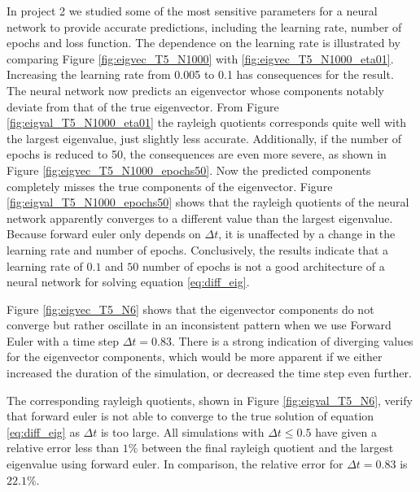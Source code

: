 \documentclass[12pt]{extarticle}
\begin{document}
In project 2 we studied some of the most sensitive parameters for a neural network to provide accurate predictions, including the learning rate, number of epochs and loss function. The dependence on the learning rate is illustrated by comparing Figure \ref{fig:eigvec_T5_N1000} with \ref{fig:eigvec_T5_N1000_eta01}. Increasing the learning rate from 0.005 to 0.1 has consequences for the result. The neural network now predicts an eigenvector whose components notably deviate from that of the true eigenvector. From Figure \ref{fig:eigval_T5_N1000_eta01} the rayleigh quotients corresponds quite well with the largest eigenvalue, just slightly less accurate. Additionally, if the number of epochs is reduced to 50, the consequences are even more severe, as shown in Figure \ref{fig:eigvec_T5_N1000_epochs50}. Now the predicted components completely misses the true components of the eigenvector. Figure \ref{fig:eigval_T5_N1000_epochs50} shows that the rayleigh quotients of the neural network apparently converges to a different value than the largest eigenvalue. Because forward euler only depends on $\Delta t$, it is unaffected by a change in the learning rate and number of epochs. Conclusively, the results indicate that a learning rate of $0.1$ and $50$ number of epochs is not a good architecture of a neural network for solving equation \eqref{eq:diff_eig}.


Figure \ref{fig:eigvec_T5_N6} shows that the eigenvector components do not converge but rather oscillate in an inconsistent pattern when we use Forward Euler with a time step $\Delta t =0.83$. There is a strong indication of diverging values for the eigenvector components, which would be more apparent if we either increased the duration of the simulation, or decreased the time step even further. 

The corresponding rayleigh quotients, shown in Figure \ref{fig:eigval_T5_N6}, verify that forward euler is not able to converge to the true solution of equation \eqref{eq:diff_eig} as $\Delta t$ is too large. All simulations with $\Delta t \leq 0.5$ have given a relative error less than $1\%$ between the final rayleigh quotient and the largest eigenvalue using forward euler. In comparison, the relative error for $\Delta t = 0.83$ is $22.1\%$.
 
\end{document}
